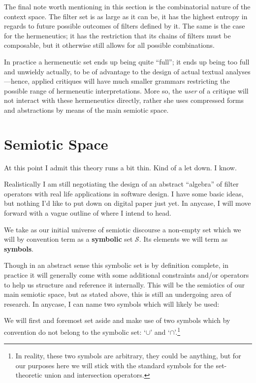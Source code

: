 \documentclass[twoside]{article}
\newenvironment{definition}[1][Definition]{\begin{trivlist}
\item[\hskip \labelsep {\bfseries #1:}]}{\end{trivlist}}
\begin{document}
The final note worth mentioning in this section is the combinatorial nature of the context space. The filter set is
as large as it can be, it has the highest entropy in regards to future possible outcomes of filters defined by it.
The same is the case for the hermeneutics; it has the restriction that its chains of filters must be composable,
but it otherwise still allows for all possible combinations.

In practice a hermeneutic set ends up being quite ``full''; it ends up being too full and unwieldy actually,
to be of advantage to the design of actual textual analyses---hence, applied critiques will have much smaller grammars
restricting the possible range of hermeneutic interpretations.  More so, the \emph{user} of a critique will not interact
with these hermeneutics directly, rather she uses compressed forms and abstractions by means of the main semiotic space.

\section*{Semiotic Space}

At this point I admit this theory runs a bit thin. Kind of a let down. I know.

Realistically I am still negotiating the design of an abstract ``algebra'' of filter operators with
real life applications in software design. I have some basic ideas, but nothing I'd like to put down
on digital paper just yet. In anycase, I will move forward with a vague outline of where I intend to head.

\begin{definition}[Semiotic Space - Context]

We take as our initial universe of semiotic discourse a non-empty set which we will by convention
term as a {\bfseries symbolic} set $ \mathcal{S} $.  Its elements we will term as {\bfseries symbols}. 

\end{definition}

Though in an abstract sense this symbolic set is by definition complete, in practice it will generally
come with some additional constraints and/or operators to help us structure and reference it internally.
This will be the semiotics of our main semiotic space, but as stated above, this is still an undergoing
area of research. In anycase, I can name two symbols which will likely be used:

We will first and foremost set aside and make use of two symbols which by convention do not belong to the
symbolic set: `$ \cup $' and `$ \cap $'.\footnote{In reality, these two symbols are arbitrary, they could be anything,
but for our purposes here we will stick with the standard symbols for the set-theoretic union and intersection operators.}
\end{document}
